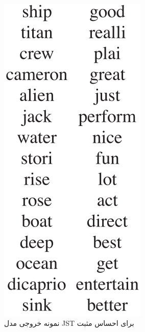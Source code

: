 	\begin{figure}[!b]
		\centering
		\begin{subfigure}{0.4\textwidth}
			\centering
			\includegraphics[scale=0.2]{chap3-img/JSTexamplep}
			\caption{نمونه خروجی مدل JST برای احساس مثبت}
			\label{chap3-fig12-1}
		\end{subfigure}		
		\begin{subfigure}{0.4\textwidth}
			\centering

\end{subfigure}
\end{figure}
